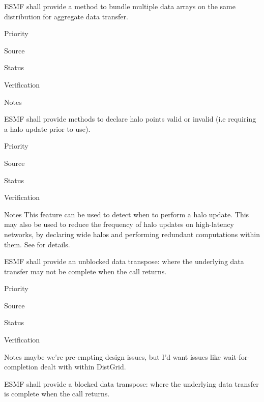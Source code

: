 
ESMF shall provide a method to bundle multiple data arrays on the same
distribution for aggregate data transfer.

\begin{reqlist}
\item[Priority]
\item[Source]
\item[Status]
\item[Verification]
\item[Notes]
\end{reqlist}


ESMF shall provide methods to declare halo points valid or invalid
(i.e requiring a halo update prior to use).

\begin{reqlist}
\item[Priority]
\item[Source]
\item[Status]
\item[Verification]
\item[Notes] This feature can be used to detect when to perform a halo
  update. This may also be used to reduce the frequency of halo
  updates on high-latency networks, by declaring wide halos and
  performing redundant computations within them. See \cite{ref:b2001}
  for details.
\end{reqlist}



ESMF shall provide an unblocked data transpose: where the underlying
data transfer may not be complete when the call returns.

\begin{reqlist}
\item[Priority]
\item[Source]
\item[Status]
\item[Verification]
\item[Notes] maybe we're pre-empting design issues, but I'd want
  issues like wait-for-completion dealt with within DistGrid.
\end{reqlist}


ESMF shall provide a blocked data transpose: where the underlying
data transfer is complete when the call returns.

